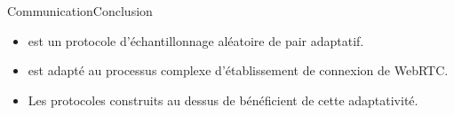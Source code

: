 \begin{frame}{Communication}{Conclusion}
  
  \begin{itemize}
  \item \SPRAY est un protocole d'échantillonnage aléatoire de pair adaptatif.
  \item \SPRAY est adapté au processus complexe d'établissement de connexion de
    WebRTC.
  \end{itemize}



  \vspace{1cm}

  \begin{itemize}
  \item Les protocoles construits au dessus de \SPRAY bénéficient de cette
    adaptativité.
  \end{itemize}

\end{frame}

